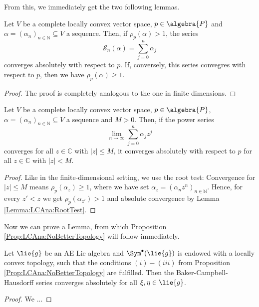 From this, we immediately get the two following lemmas.
\begin{lemma}
	\label{Lemma:LCAna:RootTest}
	Let $V$ be a complete locally convex vector space, $p \in \algebra{P}$ 
	and $\alpha = (\alpha_n)_{n \in \mathbb{N}} \subseteq V$ a sequence. 
	Then, if $\rho_p(\alpha) > 1$, the series
	\begin{equation*}
		\mathcal{S}_n(\alpha)
		=
		\sum\limits_{j = 0}^n
		\alpha_j
	\end{equation*}
	converges absolutely with respect to $p$. If, conversely, this
	series convegres with respect to $p$, then we have 
	$\rho_p(\alpha) \geq 1$.	
\end{lemma}
\begin{proof}
	The proof is completely analogous to the one in finite dimensions.
\end{proof}
\begin{lemma}
	\label{Lemma:LCAna:PowerSeriesConvAbs}
	Let $V$ be a complete locally convex vector space, $p \in \algebra{P}$, 
	$\alpha = (\alpha_n)_{n \in \mathbb{N}} \subseteq V$ a sequence and
	$M > 0$. Then, if the power series
	\begin{equation*}
		\lim_{n \longrightarrow \infty}
		\sum\limits_{j = 0}^n
		\alpha_j z^j
	\end{equation*}
	converges for all $z \in \mathbb{C}$ with $|z| \leq M$, it converges
	absolutely with respect to $p$ for all $z \in \mathbb{C}$ with $|z| < M$.
\end{lemma}
\begin{proof}
	Like in the finite-dimensional setting, we use the root test: Convergence 
	for $|z| \leq M$ means $\rho_p(\alpha_z) \geq 1$, where we have set 
	$\alpha_z = (\alpha_n z^n)_{n \in \mathbb{N}}$. Hence, for every $z' < z$ 
	we get $\rho_p(\alpha_{z'}) > 1$ and absolute convergence by Lemma 
	\ref{Lemma:LCAna:RootTest}.
\end{proof}
Now we can prove a Lemma, from which Proposition 
\ref{Prop:LCAna:NoBetterTopology} will follow immediately.
\begin{lemma}
	Let $\lie{g}$ be an AE Lie algebra and $\Sym^{\bullet}(\lie{g})$ is 
	endowed with a locally convex topology, such that the conditions $(i) - 
	(iii)$ from Proposition \ref{Prop:LCAna:NoBetterTopology} are fulfilled. 
	Then the Baker-Campbell-Hausdorff series converges absolutely for all 
	$\xi, \eta \in \lie{g}$.
\end{lemma}
\begin{proof}
	We ... 
\end{proof}
